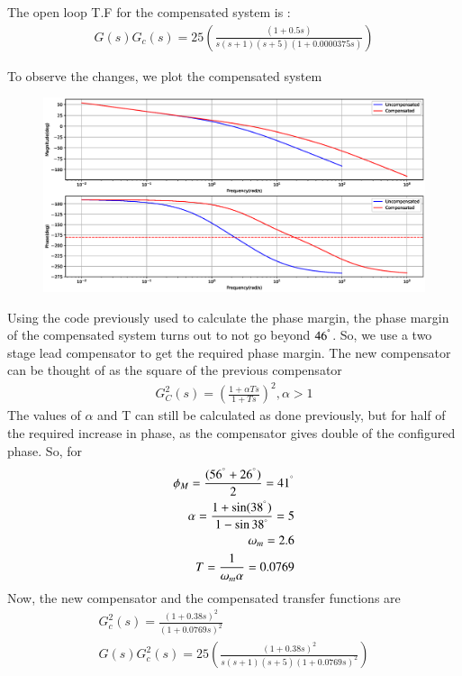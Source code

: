 \begin{enumerate}[label=\thesection.\arabic*.,ref=\thesection.\theenumi]
The open loop T.F for the compensated system is  :
\begin{align}
    G(s) G_{c}(s) = 25\left(\frac{(1+0.5s)}{s(s+1)(s+5)(1+0.0000375s)}\right)
\end{align}


To observe the changes, we plot the compensated system

\begin{figure}[!ht]
    \centering
    \includegraphics[width=\columnwidth]{./figs/ee18btech11051/ee18btech11051_fig2.eps}
    \label{fig:ee18btech11051_2}
\end{figure}

Using the code previously used to calculate the phase margin, the phase margin of the compensated system turns out to not go beyond $46^{\degree}$. So, we use a two stage lead compensator to get the required phase margin. The new compensator can be thought of as the square of the previous compensator 
\begin{align}
    G_{C}^{2}(s) = \left(\frac{1+\alpha Ts} {1+Ts}\right)^{2}, \alpha >1
\end{align}
The values of $\alpha$ and T can still be calculated as done previously, but for half of the required increase in phase, as the compensator gives double of the configured phase. So, for
\begin{align}
    \phi_{M} = \frac{(56^{\degree}+26^{\degree})}{2} = 41^{\degree}\\
    \alpha = \frac{1+\sin(38^{\degree})}{1-\sin{38^{\degree}}} = 5\\
    \omega_{m} = 2.6\\
    T = \frac{1}{\omega_{m}\alpha} = 0.0769
\end{align}
Now, the new compensator and the compensated transfer functions are
\begin{align}
    G_{c}^{2}(s) = \frac{(1 + 0.38s)^{2}}{(1 + 0.0769s)^{2}}\\
    G(s) G_{c}^{2}(s) = 25\left(\frac{(1+0.38s)^{2}}{s(s+1)(s+5)(1+0.0769s)^{2}}\right)
\end{align}



\end{enumerate}
